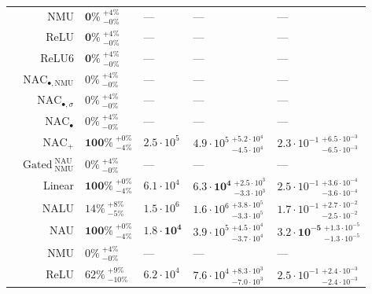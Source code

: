 \begin{longtable}{crllll}
\nopagebreak
 & NMU & $\mathbf{0\%} {~}^{+4\%}_{-0\%}$ & --- & --- & ---\\

\nopagebreak
 & ReLU & $\mathbf{0\%} {~}^{+4\%}_{-0\%}$ & --- & --- & ---\\

\nopagebreak
\multirow{-11}{*}{\centering\arraybackslash $\bm{\mathbin{/}}$} & ReLU6 & $\mathbf{0\%} {~}^{+4\%}_{-0\%}$ & --- & --- & ---\\
\cmidrule{1-6}
 & $\mathrm{NAC}_{\bullet,\mathrm{NMU}}$ & $0\% {~}^{+4\%}_{-0\%}$ & --- & --- & ---\\

\nopagebreak
 & $\mathrm{NAC}_{\bullet,\sigma}$ & $0\% {~}^{+4\%}_{-0\%}$ & --- & --- & ---\\

\nopagebreak
 & $\mathrm{NAC}_{\bullet}$ & $0\% {~}^{+4\%}_{-0\%}$ & --- & --- & ---\\

\nopagebreak
 & $\mathrm{NAC}_{+}$ & $\mathbf{100\%} {~}^{+0\%}_{-4\%}$ & $2.5 \cdot 10^{5}$ & $4.9 \cdot 10^{5} {~}^{+5.2 \cdot 10^{4}}_{-4.5 \cdot 10^{4}}$ & $2.3 \cdot 10^{-1} {~}^{+6.5 \cdot 10^{-3}}_{-6.5 \cdot 10^{-3}}$\\

\nopagebreak
 & $\mathrm{Gated~}^{\mathrm{NAU}}_{\mathrm{NMU}}$ & $0\% {~}^{+4\%}_{-0\%}$ & --- & --- & ---\\

\nopagebreak
 & Linear & $\mathbf{100\%} {~}^{+0\%}_{-4\%}$ & $6.1 \cdot 10^{4}$ & $\mathbf{6.3 \cdot 10^{4}} {~}^{+2.5 \cdot 10^{3}}_{-3.3 \cdot 10^{3}}$ & $2.5 \cdot 10^{-1} {~}^{+3.6 \cdot 10^{-4}}_{-3.6 \cdot 10^{-4}}$\\

\nopagebreak
 & NALU & $14\% {~}^{+8\%}_{-5\%}$ & $1.5 \cdot 10^{6}$ & $1.6 \cdot 10^{6} {~}^{+3.8 \cdot 10^{5}}_{-3.3 \cdot 10^{5}}$ & $1.7 \cdot 10^{-1} {~}^{+2.7 \cdot 10^{-2}}_{-2.5 \cdot 10^{-2}}$\\

\nopagebreak
 & NAU & $\mathbf{100\%} {~}^{+0\%}_{-4\%}$ & $\mathbf{1.8 \cdot 10^{4}}$ & $3.9 \cdot 10^{5} {~}^{+4.5 \cdot 10^{4}}_{-3.7 \cdot 10^{4}}$ & $\mathbf{3.2 \cdot 10^{-5}} {~}^{+1.3 \cdot 10^{-5}}_{-1.3 \cdot 10^{-5}}$\\

\nopagebreak
 & NMU & $0\% {~}^{+4\%}_{-0\%}$ & --- & --- & ---\\

\nopagebreak
 & ReLU & $62\% {~}^{+9\%}_{-10\%}$ & $6.2 \cdot 10^{4}$ & $7.6 \cdot 10^{4} {~}^{+8.3 \cdot 10^{3}}_{-7.0 \cdot 10^{3}}$ & $2.5 \cdot 10^{-1} {~}^{+2.4 \cdot 10^{-3}}_{-2.4 \cdot 10^{-3}}$\\


\end{longtable}
